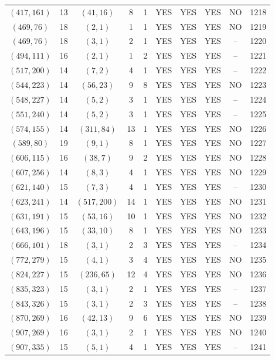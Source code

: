 \begin{longtable}{|c|c|c|c|c|c|c|c|c|c|}
$(417, 161)$ & 13 & $(41, 16)$ & 8 & 1 & YES & YES & YES & NO & 1218\\
$(469, 76)$ & 18 & $(2, 1)$ & 1 & 1 & YES & YES & YES & NO & 1219\\
$(469, 76)$ & 18 & $(3, 1)$ & 2 & 1 & YES & YES & YES & -- & 1220\\
$(494, 111)$ & 16 & $(2, 1)$ & 1 & 2 & YES & YES & YES & -- & 1221\\
$(517, 200)$ & 14 & $(7, 2)$ & 4 & 1 & YES & YES & YES & -- & 1222\\
$(544, 223)$ & 14 & $(56, 23)$ & 9 & 8 & YES & YES & YES & NO & 1223\\
$(548, 227)$ & 14 & $(5, 2)$ & 3 & 1 & YES & YES & YES & -- & 1224\\
$(551, 240)$ & 14 & $(5, 2)$ & 3 & 1 & YES & YES & YES & -- & 1225\\
$(574, 155)$ & 14 & $(311, 84)$ & 13 & 1 & YES & YES & YES & NO & 1226\\
$(589, 80)$ & 19 & $(9, 1)$ & 8 & 1 & YES & YES & YES & NO & 1227\\
$(606, 115)$ & 16 & $(38, 7)$ & 9 & 2 & YES & YES & YES & NO & 1228\\
$(607, 256)$ & 14 & $(8, 3)$ & 4 & 1 & YES & YES & YES & NO & 1229\\
$(621, 140)$ & 15 & $(7, 3)$ & 4 & 1 & YES & YES & YES & -- & 1230\\
$(623, 241)$ & 14 & $(517, 200)$ & 14 & 1 & YES & YES & YES & NO & 1231\\
$(631, 191)$ & 15 & $(53, 16)$ & 10 & 1 & YES & YES & YES & NO & 1232\\
$(643, 196)$ & 15 & $(33, 10)$ & 8 & 1 & YES & YES & YES & NO & 1233\\
$(666, 101)$ & 18 & $(3, 1)$ & 2 & 3 & YES & YES & YES & -- & 1234\\
$(772, 279)$ & 15 & $(4, 1)$ & 3 & 4 & YES & YES & YES & NO & 1235\\
$(824, 227)$ & 15 & $(236, 65)$ & 12 & 4 & YES & YES & YES & NO & 1236\\
$(835, 323)$ & 15 & $(3, 1)$ & 2 & 1 & YES & YES & YES & -- & 1237\\
$(843, 326)$ & 15 & $(3, 1)$ & 2 & 3 & YES & YES & YES & -- & 1238\\
$(870, 269)$ & 16 & $(42, 13)$ & 9 & 6 & YES & YES & YES & NO & 1239\\
$(907, 269)$ & 16 & $(3, 1)$ & 2 & 1 & YES & YES & YES & NO & 1240\\
$(907, 335)$ & 15 & $(5, 1)$ & 4 & 1 & YES & YES & YES & -- & 1241\\

\end{longtable}
